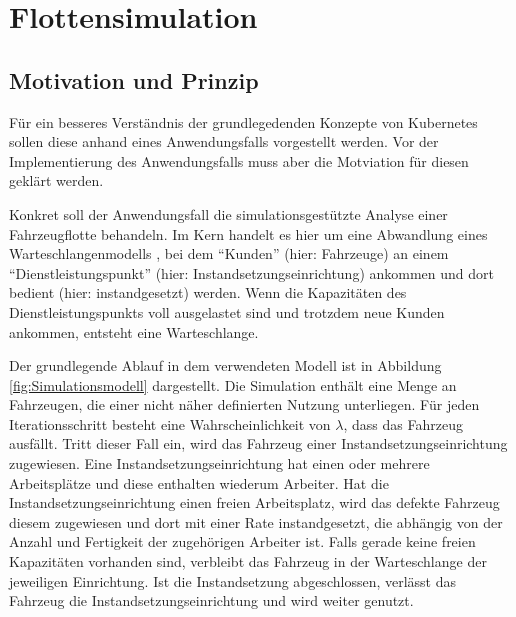 \documentclass[11pt,a4paper]{article}
\begin{document}

\section{Flottensimulation}

\subsection{Motivation und Prinzip}
Für ein besseres Verständnis der grundlegedenden Konzepte von Kubernetes sollen diese anhand eines
Anwendungsfalls vorgestellt werden.
Vor der Implementierung des Anwendungsfalls muss aber die Motviation für diesen geklärt werden.

Konkret soll der Anwendungsfall die simulationsgestützte Analyse einer Fahrzeugflotte behandeln.
Im Kern handelt es hier um eine Abwandlung eines Warteschlangenmodells \cite{Leonelli2021}, bei dem
``Kunden'' (hier: Fahrzeuge) an einem ``Dienstleistungspunkt'' (hier: Instandsetzungseinrichtung) ankommen 
und dort bedient (hier: instandgesetzt) werden.
Wenn die Kapazitäten des Dienstleistungspunkts voll ausgelastet sind und trotzdem neue Kunden ankommen, entsteht eine Warteschlange.

Der grundlegende Ablauf in dem verwendeten Modell ist in Abbildung \ref{fig:Simulationsmodell} dargestellt.
Die Simulation enthält eine Menge an Fahrzeugen, die einer nicht näher definierten Nutzung unterliegen. 
Für jeden Iterationsschritt besteht eine Wahrscheinlichkeit von $\lambda$, dass das Fahrzeug ausfällt.
Tritt dieser Fall ein, wird das Fahrzeug einer Instandsetzungseinrichtung zugewiesen. 
Eine Instandsetzungseinrichtung hat einen oder mehrere Arbeitsplätze und diese enthalten wiederum Arbeiter.
Hat die Instandsetzungseinrichtung einen freien Arbeitsplatz, wird das defekte Fahrzeug diesem zugewiesen und
dort mit einer Rate instandgesetzt, die abhängig von der Anzahl und Fertigkeit der zugehörigen Arbeiter ist.
Falls gerade keine freien Kapazitäten vorhanden sind, verbleibt das Fahrzeug in der Warteschlange der jeweiligen Einrichtung.
Ist die Instandsetzung abgeschlossen, verlässt das Fahrzeug die Instandsetzungseinrichtung und wird weiter genutzt.
\end{document}
